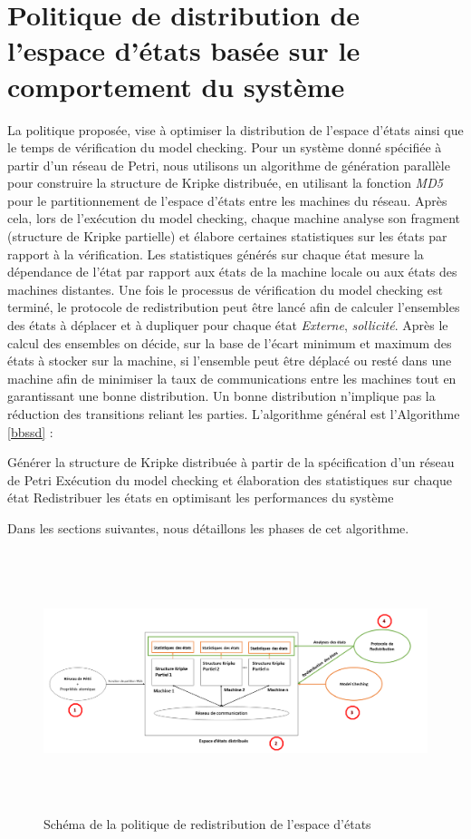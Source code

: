 
\section{Politique de distribution de l’espace d’états basée sur le	comportement du système}
 
La politique proposée, vise à optimiser la distribution de l’espace d’états ainsi que le temps de vérification du model checking. Pour un système donné spécifiée à partir d'un réseau de Petri, nous utilisons un algorithme de génération parallèle pour construire la structure de Kripke distribuée, en utilisant la fonction \emph{MD5} pour le partitionnement de l’espace d’états entre les machines du réseau. Après cela, lors de l'exécution du model checking, chaque machine analyse son fragment (structure de Kripke partielle) et élabore certaines statistiques sur les états par rapport à la vérification. Les statistiques  générés sur chaque état mesure la dépendance de l'état par rapport aux états de la machine locale ou aux états des machines distantes. Une fois le processus de vérification du model checking est terminé, le protocole de redistribution peut être lancé afin de calculer l'ensembles des états à déplacer et à dupliquer pour chaque état \emph{Externe}, \emph{sollicité}. Après le calcul des ensembles on décide, sur la base de l'écart minimum et maximum des états à stocker sur la machine, si l'ensemble peut être déplacé ou resté dans une machine afin de minimiser la taux de communications entre les machines tout en garantissant une bonne distribution. Un bonne distribution n'implique pas la réduction des transitions reliant les parties.
L’algorithme général est l'Algorithme \ref{bbssd} :\\
\begin{algorithm}[H]\label{bbssd}
	\SetAlgoLined
	 Générer la structure de Kripke distribuée à partir de la spécification d'un réseau de Petri\;
	 Exécution du model checking et élaboration des statistiques sur chaque état\;
	 Redistribuer les états en optimisant les performances du système\;	  
	\caption{\CDS{}}
\end{algorithm}
Dans les sections suivantes, nous détaillons les phases de cet algorithme.

 
\begin{figure}[h]
	\centering
	\includegraphics[height=3.0in,width=1.0\textwidth]{img/protocole}
	\caption{Schéma de la politique de redistribution de l'espace d’états}
\end{figure}
	
